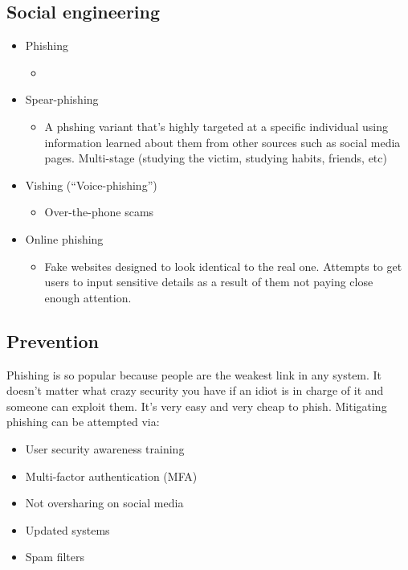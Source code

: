 \documentclass[12pt]{report}
\begin{document}
\pagebreak

\subsection{Social engineering}
\begin{itemize}
	\item Phishing
		\begin{itemize}
			\item
		\end{itemize}
	\item Spear-phishing
		\begin{itemize}
			\item A phshing variant that's highly targeted at a specific individual using information learned about them from other sources such as social media pages.
			Multi-stage (studying the victim, studying habits, friends, etc)
		\end{itemize}
	\item Vishing (``Voice-phishing'')
		\begin{itemize}
			\item Over-the-phone scams
		\end{itemize}
	\item Online phishing
		\begin{itemize}
			\item Fake websites designed to look identical to the real one. Attempts to get users to input sensitive details as a result of them not paying close enough attention.
		\end{itemize}
\end{itemize}

\subsection{Prevention}
Phishing is so popular because people are the weakest link in any system. It doesn't matter what crazy security you have if an idiot is in charge of it
and someone can exploit them. It's very easy and very cheap to phish. Mitigating phishing can be attempted via:
\begin{multicols}{2}
\begin{itemize}
	\item User security awareness training
	\item Multi-factor authentication (MFA)
	\item Not oversharing on social media
	\item Updated systems
	\item Spam filters
\end{itemize}
\end{multicols}
\pagebreak
\end{document}
